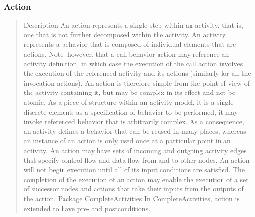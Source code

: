 \subsubsection{Action}
\begin{quotation}
Description
An action represents a single step within an activity, that is, one that is not further decomposed within the activity. An
activity represents a behavior that is composed of individual elements that are actions. Note, however, that a call behavior
action may reference an activity definition, in which case the execution of the call action involves the execution of the
referenced activity and its actions (similarly for all the invocation actions). An action is therefore simple from the point
of view of the activity containing it, but may be complex in its effect and not be atomic. As a piece of structure within an
activity model, it is a single discrete element; as a specification of behavior to be performed, it may invoke referenced
behavior that is arbitrarily complex. As a consequence, an activity defines a behavior that can be reused in many places,
whereas an instance of an action is only used once at a particular point in an activity.
An action may have sets of incoming and outgoing activity edges that specify control flow and data flow from and to
other nodes. An action will not begin execution until all of its input conditions are satisfied. The completion of the
execution of an action may enable the execution of a set of successor nodes and actions that take their inputs from the
outputs of the action.
Package CompleteActivities
In CompleteActivities, action is extended to have pre- and postconditions.


\end{quotation}
